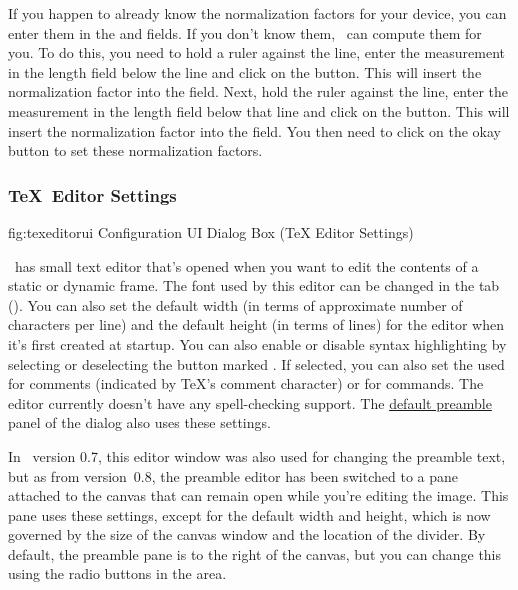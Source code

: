 If you happen to already know the normalization factors
for your device, you can enter them in the
 and
 fields. If you don't know them,
\FlowframTk\ can compute them for you. To do this, you need to hold
a ruler against the 
line, enter the measurement in the length field below the line and
\gls{click} on the  button. This
will insert the normalization factor into the
 field. Next, hold the ruler
against the  line, enter
the measurement in the length field below that line and \gls{click} on the
 button. This will insert
the normalization factor into the 
field. You then need to \gls{click} on the okay button to set these
normalization factors.

\subsubsection{\TeX\ Editor Settings}\label{sec:texeditorui}


\FloatFig
  {fig:texeditorui}
  {}
  {Configuration UI Dialog Box (TeX Editor Settings)}

\FlowframTk\ has small text editor that's opened when you want to
edit the contents of a static or dynamic frame.
The font used by this editor can be changed in the
 tab ().
You can also set the default width (in terms of approximate number
of characters per line) and the default height (in terms of lines)
for the editor when it's first created at startup. You can also
enable or disable syntax highlighting by selecting or deselecting
the button marked . If
selected, you can also set the  used for comments
(indicated by \TeX's  comment character) or for commands. The
editor currently doesn't have any spell-checking support.
The \hyperref[sec:texconfigpreamble]{default preamble} panel
of the  dialog also
uses these settings.

In \FlowframTk\ version 0.7, this editor window was also used for changing the
preamble text, but as from version~0.8, the preamble editor has been
switched to a pane attached to the \gls{canvas} that can remain open
while you're editing the image. This pane uses these settings,
except for the default width and height, which is now governed
by the size of the \gls{canvas} window and the location of the
divider. By default, the preamble pane is to the right of the
\gls{canvas}, but you can change this using the radio buttons in the
 area.

